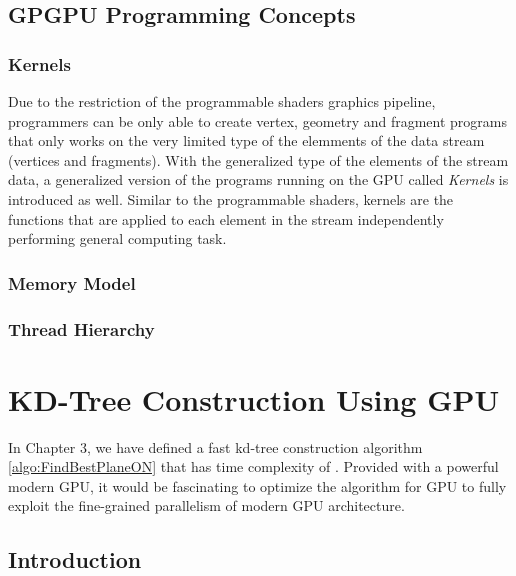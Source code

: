 
\subsection{GPGPU Programming Concepts}

\subsubsection{Kernels}
Due to the restriction of the programmable shaders graphics pipeline, programmers can be only able to create vertex, geometry and fragment programs that only works on the very limited type of the elemments of the data stream (vertices and fragments). With the generalized type of the elements of the stream data, a generalized version of the programs running on the GPU called \emph{Kernels} is introduced as well. Similar to the programmable shaders, kernels are the functions that are applied to each element in the stream independently performing general computing task.

\subsubsection{Memory Model}



\subsubsection{Thread Hierarchy}


\section{KD-Tree Construction Using GPU}
In Chapter 3, we have defined a fast kd-tree construction algorithm \ref{algo:FindBestPlaneON} that has time complexity of \mycomplexitynlogn. Provided with a powerful modern GPU, it would be fascinating to optimize the algorithm for GPU to fully exploit the fine-grained parallelism of modern GPU architecture. 


\subsection{Introduction}

